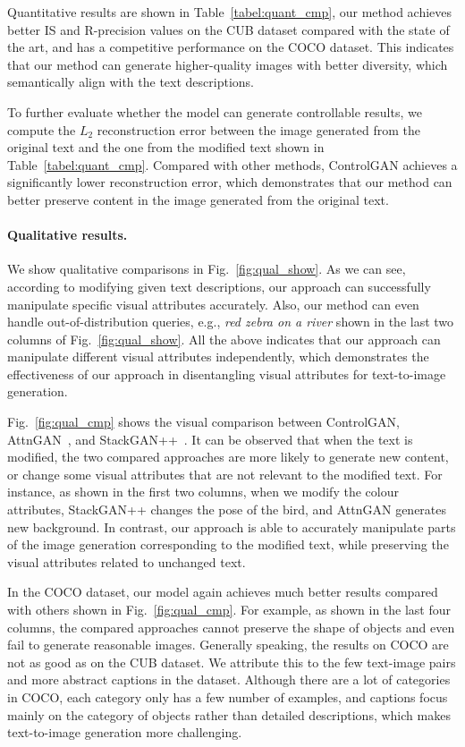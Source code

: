 Quantitative results are shown in Table~\ref{tabel:quant_cmp}, our method achieves better IS and R-precision values on the CUB dataset compared with the state of the art, and has a competitive performance on the COCO dataset. This indicates that our method can generate higher-quality images with better diversity, which semantically align with the text descriptions. 

To further evaluate whether the model can generate controllable results, we compute the $L_{2}$ reconstruction error \cite{nam2018text} between the image generated from the original text and the one from the modified text shown in Table~\ref{tabel:quant_cmp}.
Compared with other methods, ControlGAN achieves a significantly lower reconstruction error, which demonstrates that our method can better preserve content in the image generated from the original text.

\paragraph{Qualitative results.} We show qualitative comparisons in Fig.~\ref{fig:qual_show}.
As we can see, according to modifying given text descriptions, our approach can successfully manipulate specific visual attributes accurately. Also, our method can even handle out-of-distribution queries, e.g., \emph{red zebra on a river} shown in the last two columns of Fig.~\ref{fig:qual_show}.
All the above indicates that our approach can manipulate different visual attributes independently, which demonstrates the effectiveness of our approach in disentangling visual attributes for text-to-image generation.

Fig.~\ref{fig:qual_cmp} shows the visual comparison between ControlGAN, AttnGAN~\cite{xu2018attngan}, and StackGAN++~\cite{zhang2018stackgan++}. It can be observed that when the text is modified, the two compared approaches are more likely to generate new content, or change some visual attributes that are not relevant to the modified text. {For instance, as shown in the first two columns, when we modify the colour attributes, StackGAN++ changes the pose of the bird, and AttnGAN generates new background.} In contrast, our approach is able to accurately manipulate parts of the image generation corresponding to the modified text, while preserving the visual attributes related to unchanged text.

In the COCO dataset, our model again achieves much better results compared with others shown in Fig.~\ref{fig:qual_cmp}. {For example, as shown in the last four columns, the compared approaches cannot preserve the shape of objects and even fail to generate reasonable images.} Generally speaking, the results on COCO are not as good as on the CUB dataset. We attribute this to the few text-image pairs and more abstract captions in the dataset. Although there are a lot of categories in COCO, each category only has a few number of examples, and captions focus mainly on the category of objects rather than detailed descriptions, which makes text-to-image generation more challenging. 


